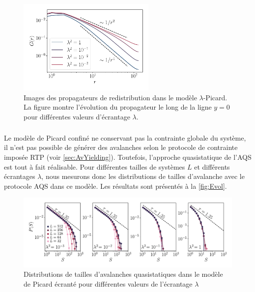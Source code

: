 \begin{figure}[h]
	\centering
	\includegraphics[width=0.6\textwidth]{Chapitre6/Figures/ScreenedPropagators.pdf}
	\caption{Images des propagateurs de redistribution dans le modèle $\lambda$-Picard. La figure montre l'évolution du propagateur le long de la ligne $y=0$ pour différentes valeurs d'écrantage $\lambda$.}
	\label{fig:screenedprop}
\end{figure}

\subparagraph{}Le modèle de Picard confiné ne conservant pas la contrainte globale du système, il n'est pas possible de générer des avalanches selon le protocole de contrainte imposée RTP (voir \autoref{sec:AvYielding}). Toutefois, l'approche quasistatique de l'AQS est tout à fait réalisable. Pour différentes tailles de systèmes $L$ et différents écrantages $\lambda$, nous mesurons donc les distributions de tailles d'avalanche avec le protocole AQS dans ce modèle. Les résultats sont présentés à la \autoref{fig:Evol}.

\begin{figure}[h]
	\centering
	\includegraphics[width=\textwidth]{Chapitre4/Figures/Avalanches/EvolLambdaAv.pdf}
	
	\caption{Distributions de tailles d'avalanches quasistatiques dans le modèle de Picard écranté pour différentes valeurs de l'écrantage $\lambda$}
	\label{fig:Evol}
\end{figure}

